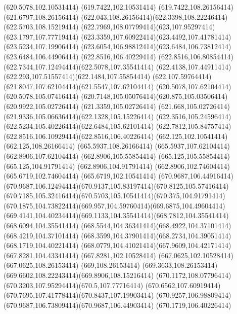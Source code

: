 {{	\lineto(620.5078,102.10531414)
	\lineto(619.7422,102.10531414)
	\lineto(619.7422,108.26156414)
	\lineto(621.6797,108.26156414)
	\curveto(622.043,108.26156414)(622.3398,108.22246414)(622.5703,108.15219414)
	\curveto(622.7969,108.07799414)(623,107.95297414)(623.1797,107.77719414)
	\curveto(623.3359,107.60922414)(623.4492,107.41781414)(623.5234,107.19906414)
	\curveto(623.6054,106.98812414)(623.6484,106.73812414)(623.6484,106.44906414)
	\closepath
	\moveto(622.8516,106.40229414)
	\curveto(622.8516,106.80854414)(622.7344,107.12494414)(622.5078,107.35541414)
	\curveto(622.4138,107.44911414)(622.293,107.51557414)(622.1484,107.55854414)
	\curveto(622,107.59764414)(621.8047,107.62104414)(621.5547,107.62104414)
	\lineto(620.5078,107.62104414)
	\lineto(620.5078,105.07416414)
	\curveto(620.7148,105.05076414)(620.875,105.03506414)(620.9922,105.02726414)
	\lineto(621.3359,105.02726414)
	\curveto(621.668,105.02726414)(621.9336,105.06636414)(622.1328,105.15226414)
	\curveto(622.3516,105.24596414)(622.5234,105.40226414)(622.6484,105.62101414)
	\curveto(622.7812,105.84757414)(622.8516,106.10929414)(622.8516,106.40226414)
	\closepath
	\moveto(662.125,102.10541414)
	\lineto(662.125,108.26166414)
	\lineto(665.5937,108.26166414)
	\lineto(665.5937,107.62104414)
	\lineto(662.8906,107.62104414)
	\lineto(662.8906,105.55854414)
	\lineto(665.125,105.55854414)
	\lineto(665.125,104.91791414)
	\lineto(662.8906,104.91791414)
	\lineto(662.8906,102.74604414)
	\lineto(665.6719,102.74604414)
	\lineto(665.6719,102.10541414)
	\closepath
	\moveto(670.9687,106.44916414)
	\curveto(670.9687,106.12494414)(670.9137,105.83197414)(670.8125,105.57416414)
	\curveto(670.7185,105.32416414)(670.5703,105.10541414)(670.375,104.91791414)
	\curveto(670.1875,104.73822414)(669.957,104.59760414)(669.6875,104.49604414)
	\curveto(669.4141,104.40234414)(669.1133,104.35541414)(668.7812,104.35541414)
	\lineto(668.6094,104.35541414)
	\curveto(668.5544,104.36341414)(668.4922,104.37101414)(668.4219,104.37101414)
	\curveto(668.3599,104.37901414)(668.2734,104.39051414)(668.1719,104.40221414)
	\curveto(668.0779,104.41021414)(667.9609,104.42171414)(667.8281,104.43341414)
	\lineto(667.8281,102.10528414)
	\lineto(667.0625,102.10528414)
	\lineto(667.0625,108.26153414)
	\lineto(669,108.26153414)
	\curveto(669.3633,108.26153414)(669.6602,108.22243414)(669.8906,108.15216414)
	\curveto(670.1172,108.07796414)(670.3203,107.95294414)(670.5,107.77716414)
	\curveto(670.6562,107.60919414)(670.7695,107.41778414)(670.8437,107.19903414)
	\curveto(670.9257,106.98809414)(670.9687,106.73809414)(670.9687,106.44903414)
	\closepath
	\moveto(670.1719,106.40226414)
}}
